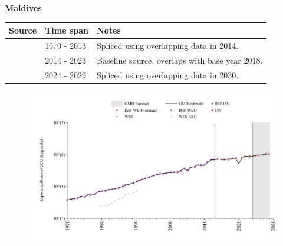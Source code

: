 \documentclass[12pt,a4paper,landscape]{article}
\begin{document}
\begin{adjustbox}{max totalsize={\paperwidth}{\paperheight},center}
\begin{minipage}[t][\textheight][t]{\textwidth}
\vspace*{0.5cm}
{}
\begin{center}
{\Large\bfseries Maldives}
\end{center}
\vspace{0.5cm}
\begin{table}[H]
\centering
\small
\begin{tabular}{|l|l|l|}
\hline
\textbf{Source} & \textbf{Time span} & \textbf{Notes} \\
\hline
\rowcolor{white}\cite{UN}& 1970 - 2013 &Spliced using overlapping data in 2014.\\
\rowcolor{lightgray}\cite{WDI}& 2014 - 2023 &Baseline source, overlaps with base year 2018.\\
\rowcolor{white}\cite{IMF_WEO_forecast}& 2024 - 2029 &Spliced using overlapping data in 2030.\\
\hline
\end{tabular}
\end{table}
\begin{figure}[H]
\centering
\includegraphics[width=\textwidth,height=0.6\textheight,keepaspectratio]{graphs/MDV_exports.pdf}
\end{figure}
\end{minipage}
\end{adjustbox}
\end{document}
